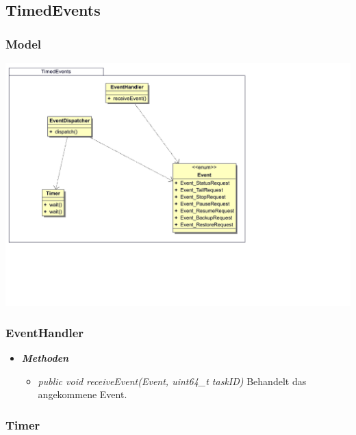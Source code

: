 \documentclass[a4paper,12pt]{article}
\begin{document}
\subsection{TimedEvents}

\subsubsection{Model}

\includegraphics[width=\textwidth]{TimedEvents}

\subsubsection{EventHandler}

\begin{itemize}[label={}]

	\item\textit{\textbf{Methoden}}
		\begin{itemize}[label={\textbullet}]
			\item\textit{public void receiveEvent(Event, uint64\_t taskID)} Behandelt das angekommene Event.
			
		\end{itemize}
\end{itemize}

\subsubsection{Timer}
\end{document}
